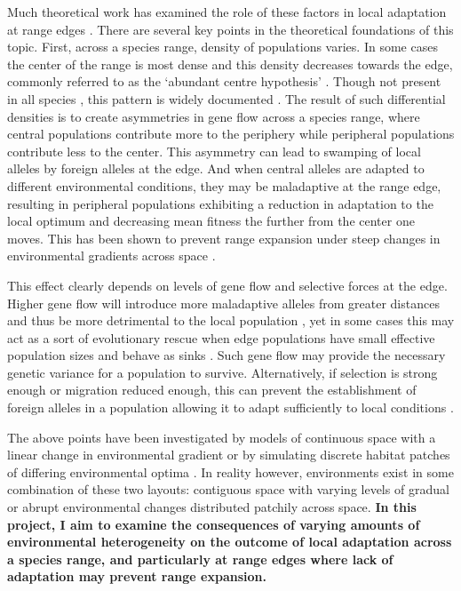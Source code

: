 Much theoretical work has examined the role of these factors in local adaptation at range 
edges \citep{GarciaRamos:1997,Ibrahim:1996,Gomulkiewicz:1995,Atkins:2010}. There are 
several key points in the theoretical foundations of this topic. First, across a species range, 
density of populations varies. In some cases the center of the range is most dense and this 
density decreases towards the edge, commonly referred to as the `abundant centre hypothesis' 
\citep{Brown:1984}. Though not present in all species \citep{Sagarin:2006}, this pattern 
is widely documented \citep{Antonovics:1976,Yeh:1979,Eckert:2008}. %
The result of such differential densities is to create asymmetries in gene flow across a 
species range, where central populations contribute more to the periphery while peripheral 
populations contribute less to the center. This asymmetry can lead to swamping of local alleles 
by foreign alleles at the edge. And when central alleles are adapted to different environmental 
conditions, they may be maladaptive at the range edge, resulting in peripheral populations 
exhibiting a reduction in adaptation to the local optimum and decreasing mean fitness the 
further from the center one moves. This has been shown to prevent range expansion under steep 
changes in environmental gradients across space \citep{Kirkpatrick:1997}.

This effect clearly depends on levels of gene flow and selective forces at the edge. Higher 
gene flow will introduce more maladaptive alleles from greater distances and thus be more 
detrimental to the local population \citep{GarciaRamos:1997}, yet in some cases this may 
act as a sort of evolutionary rescue when edge populations have small effective population 
sizes and behave as sinks \citep{Holt:1997,Gomulkiewicz:1999,Ching:2012}. Such gene 
flow may provide the necessary genetic variance for a population to survive. Alternatively, 
if selection is strong enough or migration reduced enough, this can prevent the establishment 
of foreign alleles in a population allowing it to adapt sufficiently to local conditions 
\citep{Ronce:2001}.

The above points have been investigated by models of continuous space with a linear change 
in environmental gradient \citep{Pease:1989,Kirkpatrick:1997,GarciaRamos:1997,Case:2000,Polechova:2009,Bridle:2010} 
or by simulating discrete habitat patches of differing environmental optima \citep{Aguilee:2012,Ronce:2001,Gomulkiewicz:1999}. 
In reality however, environments exist in some combination of these two layouts: contiguous 
space with varying levels of gradual or abrupt environmental changes distributed patchily 
across space. \textbf{In this project, I aim to examine the consequences of varying amounts 
of environmental heterogeneity on the outcome of local adaptation across a species range, 
and particularly at range edges where lack of adaptation may prevent range expansion.}

